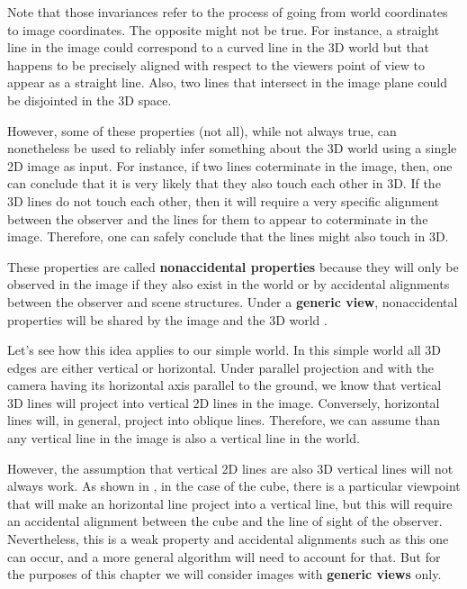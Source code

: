 Note that those invariances refer to the process of going from world coordinates to image coordinates. The opposite might not be true. For instance, a straight line in the image could correspond to a curved line in the 3D world but that happens to be precisely aligned with respect to the viewers point of view to appear as a straight line. Also, two lines that intersect in the image plane could be disjointed in the 3D space. 


However, some of these properties (not all), while not always true, can nonetheless be used to reliably infer something about the 3D world using a single 2D image as input. For instance, if two lines coterminate in the image, then, one can conclude that it is very likely that they also touch each other in 3D. If the 3D lines do not touch each other, then it will require a very specific alignment between the observer and the lines  for them to appear to coterminate in the image. Therefore, one can safely conclude that the lines might also touch in 3D. 

These properties are called {\bf nonaccidental properties} \cite{Lowe1985} because they will only be observed in the image if they also exist in the world or by accidental alignments between the observer and scene structures. Under a {\bf generic view}, nonaccidental properties will be shared by the image and the 3D world \cite{Freeman94b}. 

Let's see how this idea applies to our simple world. In this simple world all 3D edges are either vertical or horizontal.  Under parallel projection and with the camera having its horizontal axis parallel to the ground, we know that vertical 3D lines will project into vertical 2D lines in the image. Conversely, horizontal lines will, in general, project into oblique lines. Therefore, we can assume than any vertical line in the image is also a vertical line in the world. 

However, the assumption that vertical 2D lines are also 3D vertical lines will not always work. As shown in \fig{\ref{fig:accidentalAlignments}}, in the case of the cube, there is a particular viewpoint that will make an horizontal line project into a vertical line, but this will require an accidental alignment between the cube and the line of sight of the observer. Nevertheless, this is a weak property and accidental alignments such as this one can occur, and a more general algorithm will need to account for that.  But for the purposes of this chapter we will consider images with {\bf generic views} only.

